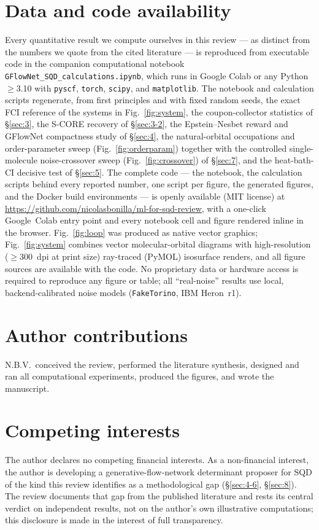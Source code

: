 \documentclass[11pt]{article}
\begin{document}
\section*{Data and code availability}
\small
Every quantitative result we compute ourselves in this review --- as distinct from the numbers we quote from the cited literature --- is reproduced from executable code in the companion computational
notebook \texttt{GFlowNet\_SQD\_calculations.ipynb}, which runs in Google Colab or any Python~$\ge$3.10 with
\texttt{pyscf}, \texttt{torch}, \texttt{scipy}, and \texttt{matplotlib}. The notebook and calculation scripts regenerate, from first
principles and with fixed random seeds, the exact FCI reference of the systems in Fig.~\ref{fig:system}, the coupon-collector
statistics of \S\ref{sec:3}, the S-CORE recovery of \S\ref{sec:3-2}, the Epstein--Nesbet reward and GFlowNet compactness study of
\S\ref{sec:4}, the natural-orbital occupations and order-parameter sweep (Fig.~\ref{fig:orderparam}) together with the controlled single-molecule noise-crossover sweep (Fig.~\ref{fig:crossover}) of \S\ref{sec:7}, and the heat-bath-CI decisive test of \S\ref{sec:5}. The complete code --- the notebook,
the calculation scripts behind every reported number, one script per figure, the generated figures, and the
Docker build environments --- is openly available (MIT license) at \url{https://github.com/nicolasbonilla/ml-for-sqd-review},
with a one-click Google~Colab entry point and every notebook cell and figure rendered inline in the browser.
Fig.~\ref{fig:loop} was produced as native vector graphics; Fig.~\ref{fig:system} combines vector molecular-orbital diagrams with high-resolution ($\ge$300~dpi at print size) ray-traced (PyMOL) isosurface renders, and all figure sources are available with the code. No proprietary data or
hardware access is required to reproduce any figure or table; all ``real-noise'' results use local,
backend-calibrated noise models (\texttt{FakeTorino}, IBM Heron~r1).

\section*{Author contributions}
\small
N.B.V.\ conceived the review, performed the literature synthesis, designed and ran all computational
experiments, produced the figures, and wrote the manuscript.

\section*{Competing interests}
\small
The author declares no competing financial interests. As a non-financial interest, the author is developing a generative-flow-network determinant proposer for SQD of the kind this review identifies as a methodological gap (\S\ref{sec:4-6}, \S\ref{sec:8}). The review documents that gap from the published literature and rests its central verdict on independent results, not on the author's own illustrative computations; this disclosure is made in the interest of full transparency.
\end{document}
